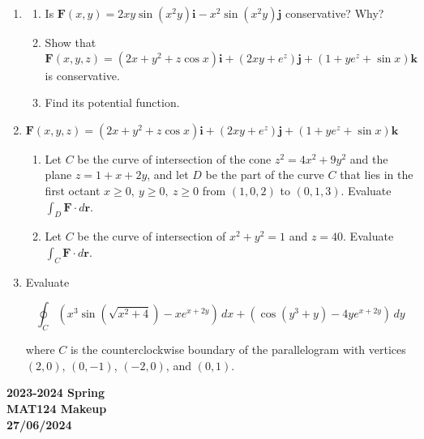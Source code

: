 \documentclass[a4paper, 12pt]{article}
\begin{document}
\begin{enumerate}[leftmargin=*,label=\textbf{\arabic*.}]
\begin{enumerate}[leftmargin=*,label=\textbf{\alph*.}]
\item Write the integral in spherical coordinates.
\end{enumerate}

\item \begin{enumerate}[leftmargin=*,label=\textbf{\alph*.}]
\item Is $\mathbf{F}(x,y)=2xy\sin\left(x^2y\right)\mathbf{i}-x^2\sin\left(x^2y\right)\mathbf{j}$ conservative? Why?
\item Show that
\[\mathbf{F}(x,y,z)=\left(2x+y^2+z\cos x\right)\mathbf{i}+\left(2xy+{e}^z\right)\mathbf{j}+\left(1+y{e}^z+\sin x\right)\mathbf{k}\]
is conservative.
\item Find its potential function.
\end{enumerate}

\newpage

\item $\mathbf{F}(x,y,z)=\left(2x+y^2+z\cos x\right)\mathbf{i}+\left(2xy+{e}^z\right)\mathbf{j}+\left(1+y{e}^z+\sin x\right)\mathbf{k}$

\begin{enumerate}[leftmargin=*,label=\textbf{\alph*.}]
\item Let $C $ be the curve of intersection of the cone $z^2=4x^2+9y^2$ and the plane $z=1+x+2y$, and let $D$ be the part of the curve $C$ that lies in the first octant $x\geq0,\:y\geq0,\:z\geq0$ from $(1,0,2)$ to $(0,1,3)$. Evaluate $\int_D\mathbf{F}\cdot d\mathbf{r}$.

\item Let $C$ be the curve of intersection of $x^2+y^2=1$ and $z=40$. Evaluate $\int_C\mathbf{F}\cdot d\mathbf{r}$.
\end{enumerate}

\item Evaluate

\[\oint_C\left(x^3\sin\left(\sqrt{x^2+4}\right)-x{e}^{x+2y}\right)\,dx + \left(\cos\left(y^3+y\right)-4y{e}^{x+2y}\right)\,dy\]

where $C$ is the counterclockwise boundary of the parallelogram with vertices $(2,0)$, $(0,-1)$, $(-2,0)$, and $(0,1)$.
\end{enumerate}

\newpage
{}
{}
\begin{center}
\textbf{2023-2024 Spring \\MAT124 Makeup\\27/06/2024}
\end{center}
\end{document}
